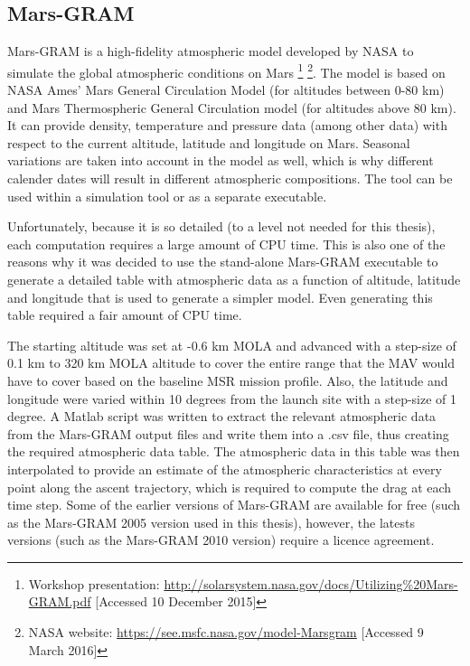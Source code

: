 \subsection{Mars-\ac{GRAM}}
\label{subsec:marsgram}
Mars-\ac{GRAM} is a high-fidelity atmospheric model developed by \ac{NASA} to simulate the global atmospheric conditions on Mars \footnote{Workshop presentation: \url{http://solarsystem.nasa.gov/docs/Utilizing\%20Mars-GRAM.pdf} [Accessed 10 December 2015]} \footnote{\ac{NASA} website: \url{https://see.msfc.nasa.gov/model-Marsgram} [Accessed 9 March 2016]}. The model is based on \ac{NASA} Ames' Mars General Circulation Model (for altitudes between 0-80 km) and Mars Thermospheric General Circulation model (for altitudes above 80 km). It can provide density, temperature and pressure data (among other data) with respect to the current altitude, latitude and longitude on Mars.  Seasonal variations are taken into account in the model as well, which is why different calender dates will result in different atmospheric compositions. The tool can be used within a simulation tool or as a separate executable. 

Unfortunately, because it is so detailed (to a level not needed for this thesis), each computation requires a large amount of CPU time. This is also one of the reasons why it was decided to use the stand-alone Mars-\ac{GRAM} executable to generate a detailed table with atmospheric data as a function of altitude, latitude and longitude that is used to generate a simpler model. Even generating this table required a fair amount of CPU time. 

The starting altitude was set at -0.6 km \ac{MOLA} and advanced with a step-size of 0.1 km to 320 km \ac{MOLA} altitude to cover the entire range that the \ac{MAV} would have to cover based on the baseline \ac{MSR} mission profile. Also, the latitude and longitude were varied within 10 degrees from the launch site with a step-size of 1 degree. A Matlab script was written to extract the relevant atmospheric data from the Mars-\ac{GRAM} output files and write them into a .csv file, thus creating the required atmospheric data table. The atmospheric data in this table was then interpolated to provide an estimate of the atmospheric characteristics at every point along the ascent trajectory, which is required to compute the drag at each time step. Some of the earlier versions of Mars-\ac{GRAM} are available for free (such as the Mars-\ac{GRAM} 2005 version used in this thesis), however, the latests versions (such as the Mars-\ac{GRAM} 2010 version) require a licence agreement.


